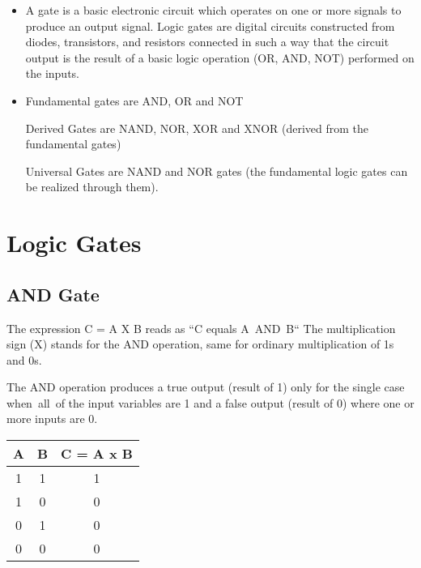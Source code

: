 \documentclass{article}
\begin{document}
\begin{itemize}
		\item A gate is a basic electronic circuit which operates on one or more signals to produce an output signal. 
		Logic gates are digital circuits constructed from diodes, transistors, and resistors connected in such a way that the circuit output is the result of a basic logic operation (OR, AND, NOT) performed on the inputs. 
		
		\item Fundamental gates are \color{red}AND, OR \color{black}and \color{red}NOT 
		\begin{center}
		\end{center}
		
		\color{black}Derived Gates are \color{red}NAND, NOR, XOR \color{black}and \color{red}XNOR \color{black}(derived from the fundamental gates)
		
		Universal Gates are \color{red}NAND \color{black} and \color{red}NOR \color{black}gates (the fundamental logic gates can be realized through them).
		
		
	\end{itemize}
\section{Logic Gates}

\subsection{AND Gate}
The expression C = A X B reads as “C equals A AND B“ 
The multiplication sign (X) stands for the AND operation, same for ordinary multiplication of 1s and 0s.
\begin{center}
\end{center}

The AND operation produces a true output (result of 1) only for the single case when all of the input variables are 1 and a false output (result of 0) where one or more inputs are 0. 
\begin{table}[h!]
	\begin{center}
		\begin{tabular}{c|c|c}
			\textbf{A} & \textbf{B} &
			\textbf{C = A x B}\\
			\hline
			1 & 1 & 1\\
			\hline
			1 & 0 & 0\\
			\hline
			0 & 1 & 0\\
			\hline
			0 & 0 & 0\\
			\hline
		\end{tabular}
	\end{center}
\end{table} \\
 
\end{document}
